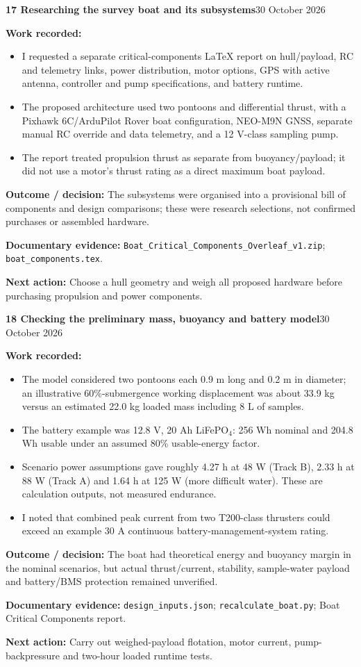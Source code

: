 \documentclass[11pt,a4paper]{article}
\newcommand{\logentry}[3]{%
  \Needspace{13\baselineskip}%
  \vspace{8pt}%
  {\large\bfseries\color{ink}#1 \quad #2}\hfill{\small\color{ink}#3}\par
  \vspace{-3pt}{\color{linecolor}\rule{\linewidth}{.6pt}}\par\vspace{1pt}%
}
\newcommand{\result}[1]{\textbf{Outcome / decision:} #1\par}
\newcommand{\evidence}[1]{\textbf{Documentary evidence:} {\small #1}\par}
\newcommand{\nextstep}[1]{\textbf{Next action:} #1\par}
\begin{document}
\logentry{17}{Researching the survey boat and its subsystems}{30 October 2026}
\textbf{Work recorded:}
\begin{itemize}
\item I requested a separate critical-components LaTeX report on hull/payload, RC and telemetry links, power distribution, motor options, GPS with active antenna, controller and pump specifications, and battery runtime.
\item The proposed architecture used two pontoons and differential thrust, with a Pixhawk 6C/ArduPilot Rover boat configuration, NEO-M9N GNSS, separate manual RC override and data telemetry, and a 12 V-class sampling pump.
\item The report treated propulsion thrust as separate from buoyancy/payload; it did not use a motor's thrust rating as a direct maximum boat payload.
\end{itemize}
\result{The subsystems were organised into a provisional bill of components and design comparisons; these were research selections, not confirmed purchases or assembled hardware.}
\evidence{\texttt{Boat\_Critical\_Components\_Overleaf\_v1.zip}; \texttt{boat\_components.tex}.}
\nextstep{Choose a hull geometry and weigh all proposed hardware before purchasing propulsion and power components.}

\logentry{18}{Checking the preliminary mass, buoyancy and battery model}{30 October 2026}
\textbf{Work recorded:}
\begin{itemize}
\item The model considered two pontoons each 0.9 m long and 0.2 m in diameter; an illustrative 60\%-submergence working displacement was about 33.9 kg versus an estimated 22.0 kg loaded mass including 8 L of samples.
\item The battery example was 12.8 V, 20 Ah LiFePO$_4$: 256 Wh nominal and 204.8 Wh usable under an assumed 80\% usable-energy factor.
\item Scenario power assumptions gave roughly 4.27 h at 48 W (Track B), 2.33 h at 88 W (Track A) and 1.64 h at 125 W (more difficult water). These are calculation outputs, not measured endurance.
\item I noted that combined peak current from two T200-class thrusters could exceed an example 30 A continuous battery-management-system rating.
\end{itemize}
\result{The boat had theoretical energy and buoyancy margin in the nominal scenarios, but actual thrust/current, stability, sample-water payload and battery/BMS protection remained unverified.}
\evidence{\texttt{design\_inputs.json}; \texttt{recalculate\_boat.py}; Boat Critical Components report.}
\nextstep{Carry out weighed-payload flotation, motor current, pump-backpressure and two-hour loaded runtime tests.}
\end{document}
